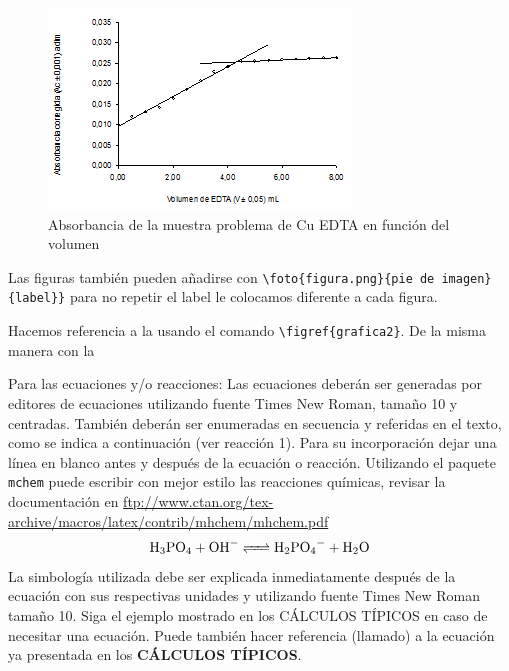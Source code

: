 \documentclass[12pt,letterpaper,twocolumn,twoside]{article}
\begin{document}
\begin{figure}[hbt]
\includegraphics[width=\columnwidth]{figura.png}
\caption{Absorbancia de la muestra problema de Cu EDTA en función del volumen}
\label{grafica}
\end{figure}

Las figuras también pueden añadirse con \verb*|\foto{figura.png}{pie de imagen}{label}}| para no repetir el label le colocamos diferente a cada figura.


Hacemos referencia a la  usando el comando \verb|\figref{grafica2}|. De la misma manera con la 

Para las ecuaciones y/o reacciones: Las ecuaciones deberán ser generadas por editores de ecuaciones utilizando fuente Times New Roman, tamaño 10 y centradas. También deberán ser enumeradas en secuencia y referidas en el texto, como se indica a continuación (ver reacción 1). Para su incorporación dejar una línea en blanco antes y después de la ecuación o reacción. Utilizando el paquete \texttt{mchem} puede escribir con mejor estilo las reacciones químicas, revisar la documentación en \url{ftp://www.ctan.org/tex-archive/macros/latex/contrib/mhchem/mhchem.pdf}
\begin{equation}
\ce{H3PO_4 + OH- <=> H_2PO_4^- + H_2O}
\end{equation}
La simbología utilizada debe ser explicada inmediatamente después de la ecuación con sus respectivas unidades y utilizando fuente Times New Roman tamaño 10. Siga el ejemplo mostrado en los CÁLCULOS TÍPICOS en caso de necesitar una ecuación. Puede también hacer referencia (llamado) a la ecuación ya presentada en los \textbf{CÁLCULOS TÍPICOS}.
\end{document}

